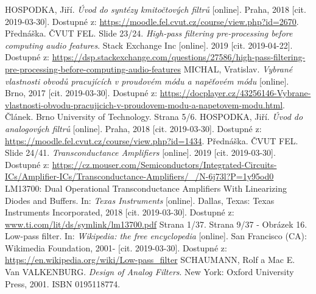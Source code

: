\documentclass[twoside]{article}
\begin{document}
\begin{thebibliography}{999}
HOSPODKA, Jiří. \textit{Úvod do syntézy kmitočtových filtrů} [online]. Praha, 2018 [cit. 2019-03-30]. Dostupné z: \url{https://moodle.fel.cvut.cz/course/view.php?id=2670}. Přednáška. ČVUT FEL. Slide 23/24.
\textit{High-pass filtering pre-processing before computing audio features}. Stack Exchange Inc [online]. 2019 [cit. 2019-04-22]. Dostupné z: \url{https://dsp.stackexchange.com/questions/27586/high-pass-filtering-pre-processing-before-computing-audio-features}
MICHAL, Vratislav. \textit{Vybrané vlastnosti obvodů pracujících v proudovém módu a napěťovém módu} [online]. Brno, 2017 [cit. 2019-03-30]. Dostupné z: \url{https://docplayer.cz/43256146-Vybrane-vlastnosti-obvodu-pracujicich-v-proudovem-modu-a-napetovem-modu.html}. Článek. Brno University of Technology. Strana 5/6.
HOSPODKA, Jiří. \textit{Úvod do analogových filtrů} [online]. Praha, 2018 [cit. 2019-03-30]. Dostupné z: \url{https://moodle.fel.cvut.cz/course/view.php?id=1434}. Přednáška. ČVUT FEL. Slide 24/41.
\textit{Transconductance Amplifiers} [online]. 2019 [cit. 2019-03-30]. Dostupné z: \url{https://cz.mouser.com/Semiconductors/Integrated-Circuits-ICs/Amplifier-ICs/Transconductance-Amplifiers/_/N-6j73l?P=1y95od0}
LM13700: Dual Operational Transconductance Amplifiers With Linearizing Diodes and Buffers. In: \textit{Texas Instruments} [online]. Dallas, Texas: Texas Instruments Incorporated, 2018 [cit. 2019-03-30]. Dostupné z: \url{www.ti.com/lit/ds/symlink/lm13700.pdf} Strana 1/37. Strana 9/37 - Obrázek 16.
Low-pass filter. In: \textit{Wikipedia: the free encyclopedia} [online]. San Francisco (CA): Wikimedia Foundation, 2001- [cit. 2019-03-30]. Dostupné z: \url{https://en.wikipedia.org/wiki/Low-pass_filter}
SCHAUMANN, Rolf a Mac E. Van VALKENBURG. \textit{Design of Analog Filters}. New York: Oxford University Press, 2001. ISBN 0195118774. 
\end{thebibliography}
\end{document}
